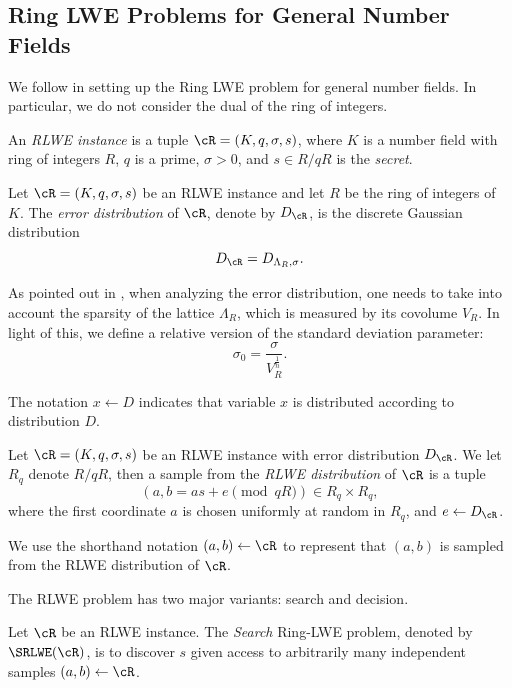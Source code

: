\documentclass[envcountsame]{llncs}
\begin{document}
\subsection{Ring LWE Problems for General Number Fields}

We follow \cite{elos2015weak} in setting up the Ring LWE problem for general number fields.  In particular, we do not consider the dual of the ring of integers.

\begin{definition}
An {\it RLWE instance} is a tuple $\cR = (K,q,\sigma,s)$, where $K$ is a number field with ring of integers $R$, $q$ is a prime, $\sigma >0$, and $s \in R/qR$ is the {\it secret}.
\end{definition}


\begin{definition}
Let $\cR = (K,q,\sigma,s)$ be an RLWE instance and let $R$ be the ring of integers of $K$. The {\it error distribution} of $\cR$, denote by $D_\cR$, is the discrete Gaussian distribution
\[
D_\cR = D_{\Lambda_R,\sigma}.
\]
\end{definition}

As pointed out in \cite{elos2015weak}, when analyzing the error distribution, one needs to take into account the sparsity of the lattice $\Lambda_R$, which is measured by its covolume $V_R$. In light of this, we define a relative version of the standard deviation parameter: $$\sigma_0 = \frac{\sigma}{V_R^{\frac{1}{n}}}.$$

The notation $x \gets D$ indicates that variable $x$ is distributed according to distribution $D$.

\begin{definition}
Let $\cR = (K,q,\sigma, s)$ be an RLWE instance with error distribution $D_\cR$. We let $R_q$ denote $R/qR$, then
a sample from the {\it RLWE distribution} of $\cR$ is a tuple
$$(a, b = as+e\pmod{qR}) \in R_q \times R_q, $$
where the first coordinate $a$ is chosen uniformly at random in $R_q$, and $e \gets D_\cR$.
\end{definition}

We use the shorthand notation $(a,b) \gets \cR$ to represent that $(a,b)$ is sampled from the RLWE distribution of $\cR$.

The RLWE problem has two major variants: search and decision.

\begin{definition}
Let $\cR$ be an RLWE instance. The {\it Search} Ring-LWE problem, denoted by $\SRLWE(\cR)$, is to discover $s$ given access to arbitrarily many independent samples $(a,b) \gets \cR$.
\end{definition}
\end{document}
